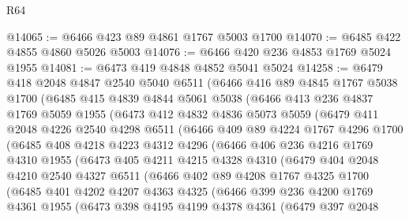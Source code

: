\begin{lexlean}{R64}
\begin{coremodule}
@14065 := @6466 @423 @89 @4861 @1767 @5003 @1700
@14070 := @6485 @422 @4855 @4860 @5026 @5003
@14076 := @6466 @420 @236 @4853 @1769 @5024 @1955
@14081 := @6473 @419 @4848 @4852 @5041 @5024
@14258 := @6479
    @418
    @2048
    @4847
    @2540
    @5040
    @6511
    (@6466
      @416
      @89
      @4845
      @1767
      @5038
      @1700
      (@6485
        @415
        @4839
        @4844
        @5061
        @5038
        (@6466
          @413
          @236
          @4837
          @1769
          @5059
          @1955
          (@6473
            @412
            @4832
            @4836
            @5073
            @5059
            (@6479
              @411
              @2048
              @4226
              @2540
              @4298
              @6511
              (@6466
                @409
                @89
                @4224
                @1767
                @4296
                @1700
                (@6485
                  @408
                  @4218
                  @4223
                  @4312
                  @4296
                  (@6466
                    @406
                    @236
                    @4216
                    @1769
                    @4310
                    @1955
                    (@6473
                      @405
                      @4211
                      @4215
                      @4328
                      @4310
                      (@6479
                        @404
                        @2048
                        @4210
                        @2540
                        @4327
                        @6511
                        (@6466
                          @402
                          @89
                          @4208
                          @1767
                          @4325
                          @1700
                          (@6485
                            @401
                            @4202
                            @4207
                            @4363
                            @4325
                            (@6466
                              @399
                              @236
                              @4200
                              @1769
                              @4361
                              @1955
                              (@6473
                                @398
                                @4195
                                @4199
                                @4378
                                @4361
                                (@6479
                                  @397
                                  @2048

\end{coremodule}
\end{lexlean}

